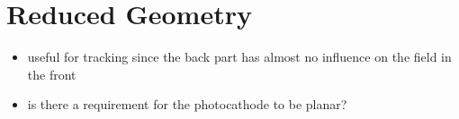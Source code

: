 \section{Reduced Geometry}
\begin{itemize}
  \item useful for tracking since the back part has almost no influence on the field in the front
  \item is there a requirement for the photocathode to be planar?
\end{itemize}

\begin{center}
\begin{figure}
  
\end{figure}
\end{center}

%   
%
%   
%
%   
